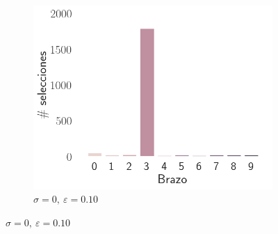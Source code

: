 \documentclass[12pt]{article}
\begin{document}
\begin{figure}[H]
        \begin{subfigure}[H]{0.3\textwidth}
            \includegraphics[width=\textwidth]{../img/2000/arm_sigma_0_epsilon_0.1}
            \caption{$\sigma=0 ,\ \varepsilon=0.10$}
            \label{fig:arms_selected_0_0.1}
        \end{subfigure}


\end{figure}
\end{document}
